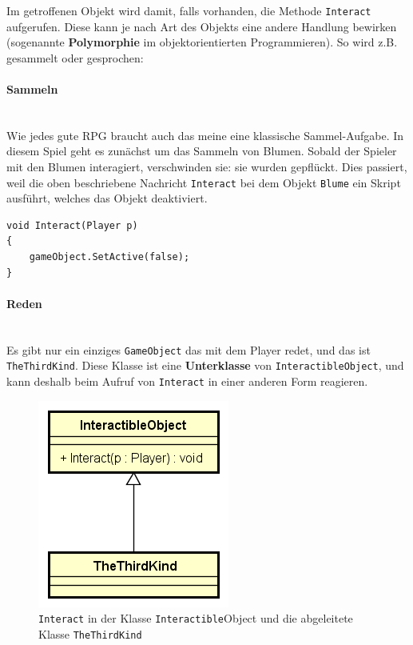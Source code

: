 Im getroffenen Objekt wird damit, falls vorhanden, die Methode \lstinline{Interact} aufgerufen. Diese kann je nach Art des Objekts eine andere Handlung bewirken (sogenannte \textbf{Polymorphie} im objektorientierten Programmieren). So wird z.B. gesammelt oder gesprochen:

\paragraph{Sammeln}\mbox{} \\
Wie jedes gute RPG braucht auch das meine eine klassische Sammel-Aufgabe.
In diesem Spiel geht es zunächst um das Sammeln von Blumen. Sobald der Spieler mit den Blumen interagiert, verschwinden sie: sie wurden gepflückt.
Dies passiert, weil die oben beschriebene Nachricht \lstinline{Interact} bei dem Objekt \lstinline{Blume} ein Skript ausführt, welches das Objekt deaktiviert.
\begin{lstlisting}[caption={Standardimplementation von Interact}]
void Interact(Player p)
{
	gameObject.SetActive(false);
}
\end{lstlisting}
 
\paragraph{Reden}\mbox{} \\
Es gibt nur ein einziges \lstinline{GameObject} das mit dem Player redet, und das ist \lstinline{TheThirdKind}. Diese Klasse ist eine \textbf{Unterklasse} von \lstinline{InteractibleObject}, und kann deshalb beim Aufruf von \lstinline{Interact} in einer anderen Form reagieren.

\begin{figure}[H]
\includegraphics[scale=0.75]{diagramme/interactibleobject.png}
\caption{\lstinline{Interact} in der Klasse \lstinline{Interactible}Object und die abgeleitete Klasse \lstinline{TheThirdKind}}
\end{figure}

